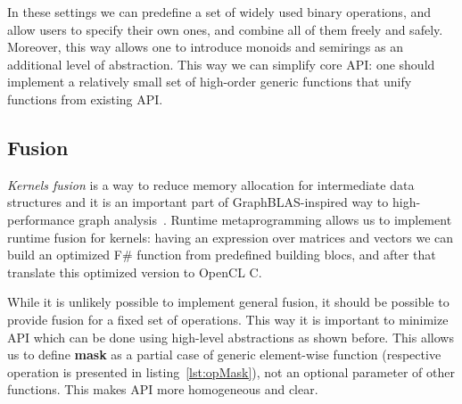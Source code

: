 In these settings we can predefine a set of widely used binary operations, and allow users to specify their own ones, and combine all of them freely and safely.
Moreover, this way allows one to introduce monoids and semirings as an additional level of abstraction. This way we can simplify core API: one should implement a relatively small set of high-order generic functions that unify functions from existing API. 

\subsection{Fusion}

\textit{Kernels fusion} is a way to reduce memory allocation for intermediate data structures and it is an important part of GraphBLAS-inspired way to high-performance graph analysis~\cite{10.1145/3466795}. Runtime metaprogramming allows us to implement runtime fusion for kernels: having an expression over matrices and vectors we can build an optimized F\# function from predefined building blocs, and after that translate this optimized version to OpenCL C.

While it is unlikely possible to implement general fusion, it should be possible to provide fusion for a fixed set of operations. This way it is important to minimize API which can be done using high-level abstractions as shown before. This allows us to define \textbf{mask} as a partial case of generic element-wise function (respective operation is presented in listing~\ref{lst:opMask}), not an optional parameter of other functions.
This makes API more homogeneous and clear.
 
